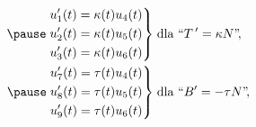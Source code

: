 \begin{frame}[<+->]


\vspace*{-0.2in}
\begin{align*}
\pause\left.\begin{aligned}      
u_1'(t)&=\kappa(t)u_4(t)\\
u_2'(t)&=\kappa(t)u_5(t)\\
u_3'(t)&=\kappa(t)u_6(t)
\end{aligned}\right\}&\;\text{dla }``T\,'=\kappa N\text{''}\!,\quad\\
\pause\left.\begin{aligned}      
u_7'(t)&=\tau(t)u_4(t)\\
u_8'(t)&=\tau(t)u_5(t)\\
u_9'(t)&=\tau(t)u_6(t)
\end{aligned}\right\}&\;\text{dla }``B'=-\tau N\text{''}\!,

\end{align*}
\end{frame}
